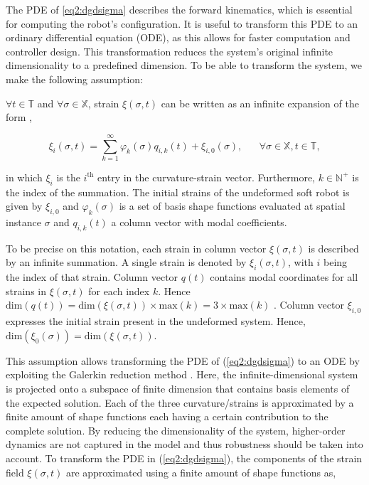 The PDE of \ref{eq2:dgdsigma} describes the forward kinematics, which is essential for computing the robot's configuration. It is useful to transform this PDE to an ordinary differential equation (ODE), as this allows for faster computation and controller design. This transformation reduces the system's original infinite dimensionality to a predefined dimension. To be able to transform the system, we make the following assumption: 

\begin{theorem}

$\forall t \in \mathbb{T}$ and $\forall \sigma \in \mathbb{X}$, strain $\xi(\sigma,t)$ can be written as an infinite expansion of the form \cite{Caasenbrood2021},

\begin{equation}
\xi_i(\sigma,t) = \sum_{k=1}^\infty \varphi_k(\sigma)q_{i,k}(t) + \xi_{i,0}(\sigma), \hspace{20pt} \forall \sigma \in \mathbb{X}, t \in \mathbb{T},
\label{eq2:strainexact}
\end{equation}

in which $\xi_{i}$ is the $i^{\text{th}}$ entry in the curvature-strain vector. Furthermore, $k \in \mathbb{N}^+$ is the index of the summation. The initial strains of the undeformed soft robot is given by $\xi_{i,0}$ and $\varphi_k(\sigma)$ is a set of basis shape functions evaluated at spatial instance $\sigma$ and $q_{i,k}(t)$ a column vector with modal coefficients. 
\end{theorem}

To be precise on this notation, each strain in column vector $\xi(\sigma,t)$ is described by an infinite summation. A single strain is denoted by $\xi_i(\sigma,t)$, with $i$ being the index of that strain. Column vector $q(t)$ contains modal coordinates for all strains in $\xi(\sigma,t)$ for each index $k$. Hence $\text{dim}(q(t)) = \text{dim}(\xi(\sigma,t)) \times \text{max}(k) = 3 \times \text{max}(k)$ . Column vector $\xi_{i,0}$ expresses the initial strain present in the undeformed system. Hence, $\text{dim}(\xi_0(\sigma)) = \text{dim}(\xi(\sigma,t))$.

This assumption allows transforming the PDE of (\ref{eq2:dgdsigma}) to an ODE by exploiting the Galerkin reduction method \cite{Galerkin}. Here, the infinite-dimensional system is projected onto a subspace of finite dimension that contains basis elements of the expected solution. Each of the three curvature/strains is approximated by a finite amount of shape functions each having a certain contribution to the complete solution. By reducing the dimensionality of the system, higher-order dynamics are not captured in the model and thus robustness should be taken into account. To transform the PDE in (\ref{eq2:dgdsigma}), the components of the strain field $\xi(\sigma,t)$ are approximated using a finite amount of shape functions as,

